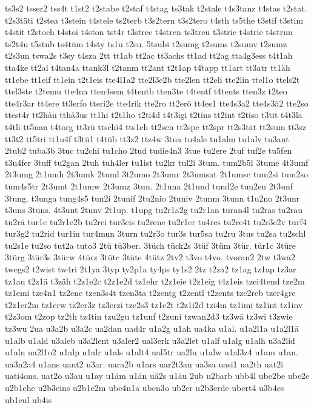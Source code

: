 {ts3s2
tsser2
tss4t
t1st2
t2stabe
t2staf
t4stag
ts3tak
t2stale
t4s3tanz
t4stas
t2stat.
t2s3täti
t2stea
t3stein
t4stele
ts2terb
t3s2tern
t3s2tero
t4sth
ts5the
t3stif
t3stim
t4stit
t2stoch
t4stoi
t4ston
tst4r
t3strec
t4stren
ts3treu
t3stric
t4strie
t4strun
ts2t4u
t5stub
ts4tüm
t4sty
ts1u
t2su.
5tsubi
t2sumg
t2sums
t2sumv
t2sumz
t2s3un
tswa2s
t3sy
t4sza
2tt
tt1ab
tt2ac
tt3achs
tt1ad
tt2ag
tta4g3ess
t4t1ah
tta4ke
tt2al
t4tan4a
ttank3l
t2tanm
tt2ant
t2t1ap
t4tapp
tt1art
tt3atr
tt1äh
tt1ebe
tt1eif
tt1ein
t2t1eis
tte4l1a2
tte2l3e2b
tte2len
tt2eli
tte2lin
ttel1o
ttels2t
ttel3ste
t2temu
tte4na
tten4sem
t4tentb
tten3te
t4tentf
t4tents
tten3z
t2teo
tte4r3ar
tt4ere
tt3erfo
tteri2e
tte4rik
tte2ro
tt2erö
tt4es1
tte4s3a2
tte4s3ä2
tte2so
ttest4r
tt2häu
tthä3us
tt1hi
t2t1ho
t2ti4d
t4t3igi
t2tins
tt2int
t2tiso
t3tit
t4t3la
t4tli
tt5nan
t4torg
tt3rü
ttschi4
tts1eh
tt2sen
tt2spe
tt2spr
tt2s3tät
tt2sum
tt3sz
tt3t2
tt5tri
tt1u4f
t3tü1
t4tüb
tt3z2
ttz4w
3tua
tu4ale
tu1alm
tu1alv
tu3ant
2tub2
tuba3b
3tuc
tu2chi
tu1cho
2tud
tudie4n3
3tue
tu2ere
2tuf
tuf2e
tu5fen
t3u4fer
3tuff
tu2gan
2tuh
tuh4ler
tu1ist
tu2kr
tul2i
3tum.
tum2b5l
3tume
4t3umf
2t3umg
2t1umh
2t3umk
2tuml
3t2umo
2t3umr
2t3umsat
2t1umsc
tum2si
tum2so
tum4s5tr
2t3umt
2t1umw
2t3umz
3tun.
2t1una
2t1und
tund2e
tun2en
2t3unf
3tung.
t3unga
tung4s5
tun2i
2tunif
2tu2nio
2tuniv
2tunm
3tunn
t1u2no
2t3unr
t3uns
3tuns.
4t3unt
2tunv
2t1up.
t1upg
tu2r1a2g
tu2r1an
turan4l
tu2ras
tu2rau
tu2rä
tur1c
tu2r1e2b
tu2rei
tur3eis
tu2rene
tu2r1er
tu4res
tu2re4t
tu2r3e2v
turf4
tur3g2
tu2rid
tur1in
tur4mun
3turn
tu2r3o
tur3s
tur5sa
tu2ru
3tus
tu2sa
tu2schl
tu2s1e
tu2so
tut2a
tuto3
2tü
tü3ber.
3tüch
tück2s
3tüf
3tüm
3tür.
tür1c
3türe
3türg
3tür3s
3türw
4türz
3tütc
3tüte
4tütz
2tv2
t3vo
t4vo.
tvoran2
2tw
t3wa2
twegs2
t2wist
tw4ri
2t1ya
3typ
ty2p1a
ty4ps
ty1s2
2tz
t2za2
tz1ag
tz1ap
tz3ar
tz1au
t2z1ä
t3zäh
t2z1e2c
t2z1e2d
tz1ehr
t2z1eie
t2z1eig
t4z1eis
tzei4tend
tze2m
tz1emi
tze4n1
tz2ene
tzen3s4t
tzen3ta
t2zentg
t2zentl
t2zents
tze2reb
tzer4gre
t2z1er2m
tz1erw
tz2er3z
tz3erzi
tze2s3
tz1e2t
t2z1i2d
tzi4m
tz1imi
tz1int
tz1inv
t2z3om
t2zop
tz2th
tz4tin
tzu2gu
tz1unf
t2zuni
tzwan2d3
tz3wä
tz3wi
t3zwie
tz3wu
2ua
u3a2b
u3a2c
ua2dan
uad4r
u1a2g
u1ah
ua4ka
u1al.
u1a2l1a
u1a2l1ä
u1alb
u1ald
u3aleb
u3a2lent
u3aler2
ual3erk
u3a2let
u1alf
u1alg
u1alh
u3a2lid
u1aln
ua2l1o2
u1alp
u1alr
u1als
u1alt4
ual5tr
ua2lu
u1alw
u1al3z4
u1am
u1an.
ua3n2a4
u1ans
uant2
u3ar.
uara2b
u1ars
uar2t3an
ua3sa
uasi1
ua2th
uat2i
uati4ons.
uat2o
u3au
u1ay
u1äm
u1än
uä2s
u1äu
2ub
u2barb
ubb4l
ube2be
ube2e
u2b1ehe
u2b3eins
u2b1e2m
ube4n1a
uben3o
ub2er
u2b3erde
ubert4
u3b4es
ub1eul
ub4is
}
